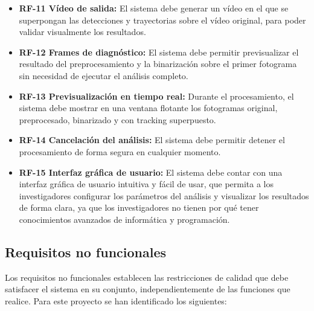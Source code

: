 \begin{itemize}
    \item \textbf{RF-11 Vídeo de salida:} El sistema debe generar un vídeo en el que se superpongan las detecciones y trayectorias sobre el vídeo original, para poder validar visualmente los resultados.
    \item \textbf{RF-12 Frames de diagnóstico:} El sistema debe permitir previsualizar el resultado del preprocesamiento y la binarización sobre el primer fotograma sin necesidad de ejecutar el análisis completo.
    \item \textbf{RF-13 Previsualización en tiempo real:} Durante el procesamiento, el sistema debe mostrar en una ventana flotante los fotogramas original, preprocesado, binarizado y con tracking superpuesto.
    \item \textbf{RF-14 Cancelación del análisis:} El sistema debe permitir detener el procesamiento de forma segura en cualquier momento.
    \item \textbf{RF-15 Interfaz gráfica de usuario:} El sistema debe contar con una interfaz gráfica de usuario intuitiva y fácil de usar, que permita a los investigadores configurar los parámetros del análisis y visualizar los resultados de forma clara, ya que los investigadores no tienen por qué tener conocimientos avanzados de informática y programación.
\end{itemize}

\subsection {Requisitos no funcionales}

Los requisitos no funcionales establecen las restricciones de calidad que debe satisfacer el sistema en su conjunto, independientemente de las funciones que realice. Para este proyecto se han identificado los siguientes:

